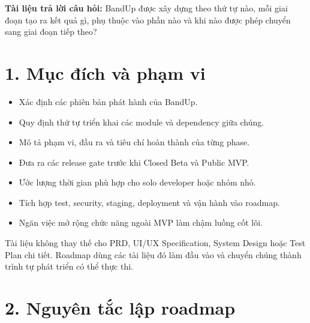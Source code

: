 \documentclass[
  11pt,
  a4paper,
]{article}
\begin{document}
\textbf{Tài liệu trả lời câu hỏi:} BandUp được xây dựng theo thứ tự nào,
mỗi giai đoạn tạo ra kết quả gì, phụ thuộc vào phần nào và khi nào được
phép chuyển sang giai đoạn tiếp theo?

\tableofcontents
\clearpage

\section{1. Mục đích và phạm
vi}\label{mux1ee5c-ux111uxedch-vuxe0-phux1ea1m-vi}

\begin{itemize}
\item
  Xác định các phiên bản phát hành của BandUp.
\item
  Quy định thứ tự triển khai các module và dependency giữa chúng.
\item
  Mô tả phạm vi, đầu ra và tiêu chí hoàn thành của từng phase.
\item
  Đưa ra các release gate trước khi Closed Beta và Public MVP.
\item
  Ước lượng thời gian phù hợp cho solo developer hoặc nhóm nhỏ.
\item
  Tích hợp test, security, staging, deployment và vận hành vào roadmap.
\item
  Ngăn việc mở rộng chức năng ngoài MVP làm chậm luồng cốt lõi.
\end{itemize}

Tài liệu không thay thế cho PRD, UI/UX Specification, System Design hoặc
Test Plan chi tiết. Roadmap dùng các tài liệu đó làm đầu vào và chuyển
chúng thành trình tự phát triển có thể thực thi.

\section{2. Nguyên tắc lập
roadmap}\label{nguyuxean-tux1eafc-lux1eadp-roadmap}
\end{document}
